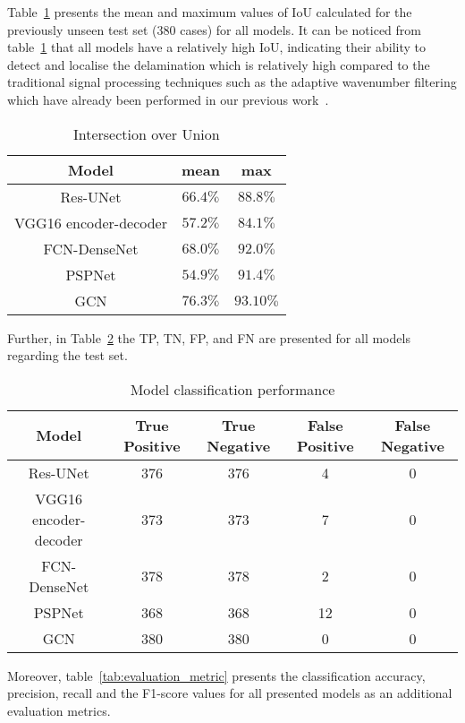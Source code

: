 Table~\ref{tab:table_iou} presents the mean and maximum values of IoU calculated for the previously unseen test set (380 cases) for all models.
It can be noticed from table~\ref{tab:table_iou}  that all models have a relatively high IoU, indicating their ability to detect and localise the delamination which is relatively high compared to the traditional signal processing techniques such as the adaptive wavenumber filtering which have already been performed in our previous work~\cite{Ijjeh2021}.
\begin{table}[]
	\centering
	\caption{Intersection over Union}
	\label{tab:table_iou}
	\begin{tabular}{ccc}\hline
		Model & mean & max \\ \hline
		Res-UNet & \(66.4\%\) & \(88.8\%\) \\ 
		VGG16 encoder-decoder & \(57.2\%\) & \(84.1\%\) \\ 
		FCN-DenseNet & \(68.0\%\) & \(92.0\%\) \\ 
		PSPNet & \(54.9\%\) & \(91.4\%\) \\ 
		GCN & \(76.3\%\) & \(93.10\%\) \\ \hline
	\end{tabular}
\end{table}
Further, in Table~\ref{tab:table_performance} the TP, TN, FP, and FN are presented for all models regarding the test set. 
\begin{table}[]
	\centering
	\caption{Model classification performance}
	\label{tab:table_performance}
	\resizebox{\textwidth}{!}
	{
		\begin{tabular}{ccccc} \hline
			Model& True Positive & True Negative & False Positive & False Negative \\ \hline
			Res-UNet & 376 & 376 & 4 & 0 \\ 
			VGG16 encoder-decoder & 373 & 373 & 7 & 0 \\ 
			FCN-DenseNet & 378 & 378 & 2 & 0 \\ 
			PSPNet & 368 & 368 & 12 & 0 \\ 
			GCN & 380 & 380 & 0 & 0 \\ \hline
		\end{tabular}
	}
\end{table}
Moreover, table~\ref{tab:evaluation_metric} presents the classification accuracy, precision, recall and the F1-score values for all presented models as an additional evaluation metrics.
